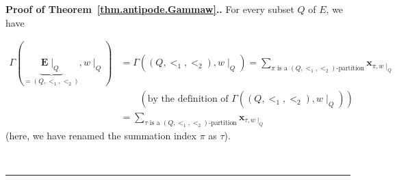 \documentclass[numbers=enddot,12pt,final,onecolumn,notitlepage,abstracton]{scrartcl}%
\theoremstyle{definition}
\newenvironment{proof}[1][Proof]{\noindent\textbf{#1.} }{\ \rule{0.5em}{0.5em}}
\let\sumnonlimits\sum
\renewcommand{\sum}{\sumnonlimits\limits}
\newcommand{\xx}{{\mathbf{x}}}
\newcommand{\EE}{{\mathbf{E}}}
\begin{document}
\begin{proof}[Proof of Theorem~\ref{thm.antipode.Gammaw}.]
For every subset $Q$ of $E$, we have

\begin{align}
\Gamma\left(\underbrace{\EE\mid_Q}_{=\left(Q, <_1, <_2\right)}, w\mid_Q\right)
&= \Gamma\left(\left(Q, <_1, <_2\right), w\mid_Q\right)
\nonumber 
= \sum_{\pi \text{ is a }\left(Q, <_1, <_2\right)\text{-partition}}
\xx_{\pi, w\mid_Q}
\nonumber \\
& \qquad \left(\text{by the definition of }
 \Gamma\left(\left(Q, <_1, <_2\right), w\mid_Q\right) \right)
\nonumber \\
& = \sum_{\tau \text{ is a }\left(Q, <_1, <_2\right)\text{-partition}}
\xx_{\tau, w\mid_Q}
\label{pf.thm.antipode.Gammaw.Req.pf.Gamma2}
\end{align}
(here, we have renamed the summation index $\pi$ as
$\tau$).



\end{proof}
\end{document}
